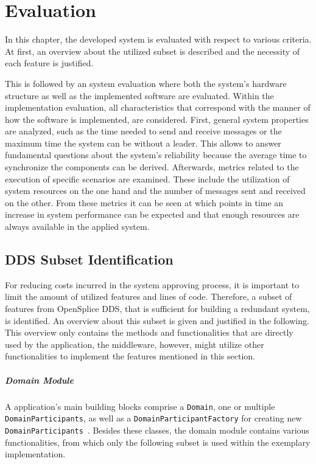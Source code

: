 \chapter{Evaluation}
\label{cpt:evaluation}
In this chapter, the developed system is evaluated with respect to various criteria.
At first, an overview about the utilized  subset is described and the necessity of each feature is justified.

This is followed by an system evaluation where both the system's hardware structure as well as the implemented software are evaluated.
Within the implementation evaluation, all characteristics that correspond with the manner of how the software is implemented, are considered.
First, general system properties are analyzed, such as the time needed to send and receive messages or the maximum time the system can be without a leader.
This allows to answer fundamental questions about the system's reliability because the average time to synchronize the components can be derived.
Afterwards, metrics related to the execution of specific scenarios are examined.
These include the utilization of system resources on the one hand and the number of messages sent and received on the other.
From these metrics it can be seen at which points in time an increase in system performance can be expected and that enough resources are always available in the applied system.

\section{DDS Subset Identification}

For reducing costs incurred in the system approving process, it is important to limit the amount of utilized features and lines of code.
Therefore, a subset of  features from OpenSplice DDS, that is sufficient for building a redundant system, is identified.
An overview about this subset is given and justified in the following.
This overview only contains the methods and functionalities that are directly used by the application, the middleware, however, might utilize other functionalities to implement the features mentioned in this section.

\paragraph{Domain Module}
A  application's main building blocks comprise a \texttt{Domain}, one or multiple \texttt{DomainParticipants}, as well as a \texttt{DomainParticipantFactory} for creating new \texttt{DomainParticipants}~\cite{omgDDSspec}.
Besides these classes, the domain module contains various functionalities, from which only the following subset is used within the exemplary implementation.

